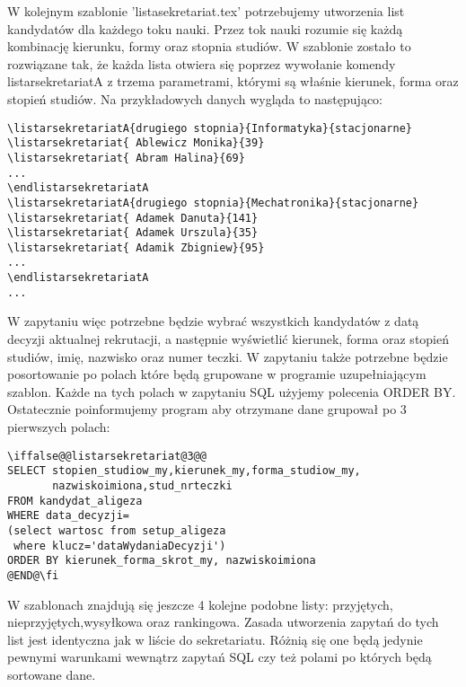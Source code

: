 W kolejnym szablonie 'listasekretariat.tex' potrzebujemy utworzenia list kandydatów dla każdego toku nauki. Przez tok nauki rozumie się każdą kombinację kierunku, formy oraz stopnia studiów. W szablonie zostało to rozwiązane tak, że każda lista otwiera się poprzez wywołanie komendy listarsekretariatA z trzema parametrami, którymi są właśnie kierunek, forma oraz stopień studiów. Na przykładowych danych wygląda to następująco:
 \begin{verbatim}
\listarsekretariatA{drugiego stopnia}{Informatyka}{stacjonarne}
\listarsekretariat{ Ablewicz Monika}{39}
\listarsekretariat{ Abram Halina}{69}
...
\endlistarsekretariatA
\listarsekretariatA{drugiego stopnia}{Mechatronika}{stacjonarne}
\listarsekretariat{ Adamek Danuta}{141}
\listarsekretariat{ Adamek Urszula}{35}
\listarsekretariat{ Adamik Zbigniew}{95}
...
\endlistarsekretariatA
...
\end{verbatim}

W zapytaniu więc potrzebne będzie wybrać wszystkich kandydatów z datą decyzji aktualnej rekrutacji, a następnie wyświetlić kierunek, forma oraz stopień studiów, imię, nazwisko oraz numer teczki. W zapytaniu także potrzebne będzie posortowanie po polach które będą grupowane w programie uzupełniającym szablon. Każde na tych polach w zapytaniu SQL użyjemy polecenia ORDER BY. Ostatecznie poinformujemy program aby otrzymane dane grupował po 3 pierwszych polach:
 \begin{verbatim}
\iffalse@@listarsekretariat@3@@
SELECT stopien_studiow_my,kierunek_my,forma_studiow_my,
       nazwiskoimiona,stud_nrteczki
FROM kandydat_aligeza
WHERE data_decyzji=
(select wartosc from setup_aligeza
 where klucz='dataWydaniaDecyzji')
ORDER BY kierunek_forma_skrot_my, nazwiskoimiona
@END@\fi
\end{verbatim}

W szablonach znajdują się jeszcze 4 kolejne podobne listy: przyjętych, nieprzyjętych,wysyłkowa oraz rankingowa. Zasada utworzenia zapytań do tych list jest identyczna jak w liście do sekretariatu. Różnią się one będą jedynie pewnymi warunkami wewnątrz zapytań SQL czy też polami po których będą sortowane dane.

